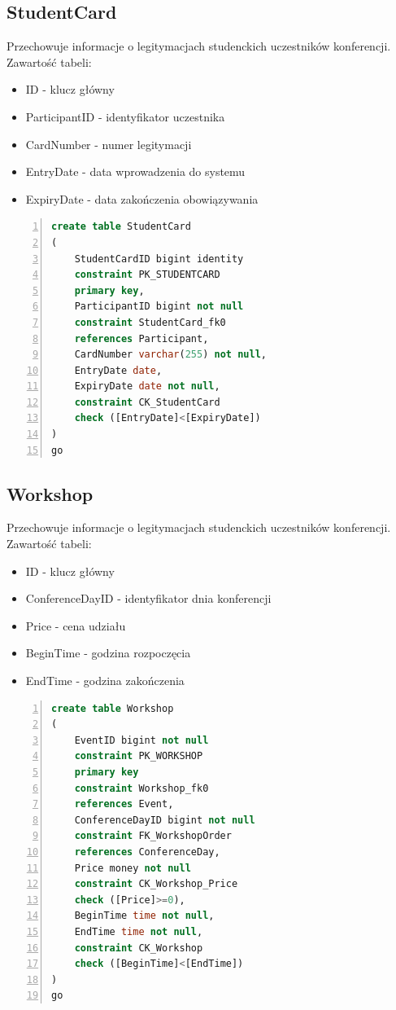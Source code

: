 \documentclass[]{article}
\begin{document}
	\subsection{StudentCard}
	Przechowuje informacje o legitymacjach studenckich uczestników konferencji. Zawartość tabeli:
	\begin{itemize}
		\item ID - klucz główny
		\item ParticipantID - identyfikator uczestnika
		\item CardNumber - numer legitymacji
		\item EntryDate - data wprowadzenia do systemu
		\item ExpiryDate - data zakończenia obowiązywania
	\end{itemize}
	\begin{lstlisting}[language=SQL,
						showspaces=false,
						basicstyle=\ttfamily,
						numbers=left,
						numberstyle=\tiny,
						backgroundcolor=\color{lightg},
						keywordstyle=\color{lightblue},
						commentstyle=\color{gray}]
create table StudentCard
(
	StudentCardID bigint identity
	constraint PK_STUDENTCARD
	primary key,
	ParticipantID bigint not null
	constraint StudentCard_fk0
	references Participant,
	CardNumber varchar(255) not null,
	EntryDate date,
	ExpiryDate date not null,
	constraint CK_StudentCard
	check ([EntryDate]<[ExpiryDate])
)
go
	\end{lstlisting}
	\subsection{Workshop}
	Przechowuje informacje o legitymacjach studenckich uczestników konferencji. Zawartość tabeli:
	\begin{itemize}
		\item ID - klucz główny
		\item ConferenceDayID - identyfikator dnia konferencji
		\item Price - cena udziału
		\item BeginTime - godzina rozpoczęcia
		\item EndTime - godzina zakończenia
	\end{itemize}
	\begin{lstlisting}[language=SQL,
						showspaces=false,
						basicstyle=\ttfamily,
						numbers=left,
						numberstyle=\tiny,
						backgroundcolor=\color{lightg},
						keywordstyle=\color{lightblue},
						commentstyle=\color{gray}]
create table Workshop
(
	EventID bigint not null
	constraint PK_WORKSHOP
	primary key
	constraint Workshop_fk0
	references Event,
	ConferenceDayID bigint not null
	constraint FK_WorkshopOrder
	references ConferenceDay,
	Price money not null
	constraint CK_Workshop_Price
	check ([Price]>=0),
	BeginTime time not null,
	EndTime time not null,
	constraint CK_Workshop
	check ([BeginTime]<[EndTime])
)
go
	\end{lstlisting}
	
\end{document}
